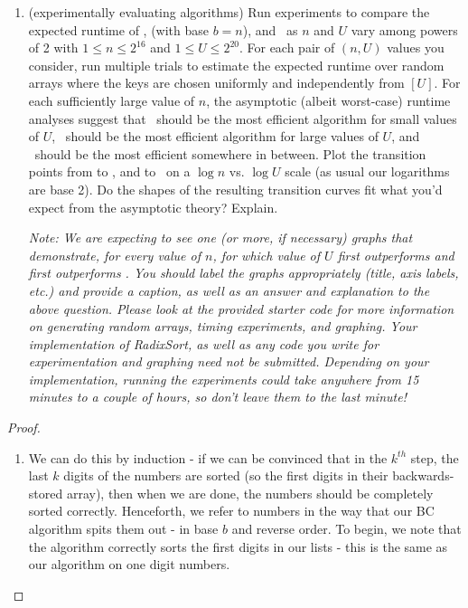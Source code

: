\documentclass[11pt]{article}
\begin{document}
\begin{enumerate}
\begin{enumerate}
            \item (experimentally evaluating algorithms) Run experiments to compare the expected runtime of \CountingSort, \RadixSort (with base $b=n$), and \MergeSort\ as $n$ and $U$ vary among powers of 2 with $1\leq n\leq 2^{16}$ and $1\leq U\leq 2^{20}$.  For each pair of $(n,U)$ values you consider, run multiple trials to estimate the expected runtime over random arrays where the keys are chosen uniformly and independently from $[U]$.  For each sufficiently large value of $n$, the asymptotic (albeit worst-case) runtime analyses suggest that \CountingSort\ should be the most efficient algorithm for small values of $U$, \MergeSort\ should be the most efficient algorithm for large values of $U$, and \RadixSort\ should be the most efficient somewhere in between.  Plot the transition points from \CountingSort to \RadixSort, and \RadixSort to \MergeSort\ on a $\log n$ vs. $\log U$ scale (as usual our logarithms are base 2).  Do the shapes of the resulting transition curves fit what you'd expect from the asymptotic theory?  Explain.  %
            
            \textit{Note: We are expecting to see one (or more, if necessary) graphs that demonstrate, for every value of $n$, for which value of $U$ \RadixSort first outperforms \CountingSort and \MergeSort first outperforms \RadixSort. You should label the graphs appropriately (title, axis labels, etc.) and provide a caption, as well as an answer and explanation to the above question. Please look at the provided starter code for more information on generating random arrays, timing experiments, and graphing. Your implementation of RadixSort, as well as any code you write for experimentation and graphing need not be submitted.  Depending on your implementation, running the experiments could take anywhere from 15 minutes to a couple of hours, so don't leave them to the last minute!}   

          
        \end{enumerate}
        
\begin{proof}
\begin{enumerate}[label = (\alph*)]

\item We can do this by induction - if we can be convinced that in the $k^{th}$ step, the last $k$ digits of the numbers are sorted (so the first digits in their backwards-stored array), then when we are done, the numbers should be completely sorted correctly. Henceforth, we refer to numbers in the way that our BC algorithm spits them out - in base $b$ and reverse order. To begin, we note that the algorithm correctly sorts the first digits in our lists - this is the same as our \CountingSort algorithm on one digit numbers.


\end{enumerate}
\end{proof}
\end{enumerate}
\end{document}

